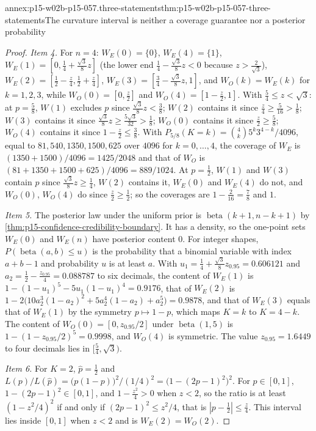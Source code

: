 \begin{annexitem}{annex:p15-w02b-p15-057.three-statements}{thm:p15-w02b-p15-057-three-statements}{The curvature interval is neither a coverage guarantee nor a posterior probability}
\begin{proof}
\emph{Item 4.} For \(n=4\): \(W_E(0)=\{0\}\), \(W_E(4)=\{1\}\),
\(W_E(1)=[0,\frac14+\frac{\sqrt3}8z]\) (the lower end
\(\frac14-\frac{\sqrt3}8z<0\) because \(z>\frac2{\sqrt3}\)),
\(W_E(2)=[\frac12-\frac z4,\frac12+\frac z4]\),
\(W_E(3)=[\frac34-\frac{\sqrt3}8z,1]\), and \(W_O(k)=W_E(k)\) for
\(k=1,2,3\), while \(W_O(0)=[0,\frac z2]\) and \(W_O(4)=[1-\frac z2,1]\).
With \(\frac54\leq z<\sqrt3\): at \(p=\frac58\), \(W(1)\) excludes \(p\)
since \(\frac{\sqrt3}8z<\frac38\); \(W(2)\) contains it since
\(\frac z4\geq\frac5{16}>\frac18\); \(W(3)\) contains it since
\(\frac{\sqrt3}8z\geq\frac{5\sqrt3}{32}>\frac18\); \(W_O(0)\) contains it
since \(\frac z2\geq\frac58\); \(W_O(4)\) contains it since
\(1-\frac z2\leq\frac38\). With
\(P_{5/8}(K=k)=\binom4k5^k3^{4-k}/4096\), equal to \(81,540,1350,1500,625\)
over \(4096\) for \(k=0,\ldots,4\), the coverage of \(W_E\) is
\((1350+1500)/4096=1425/2048\) and that of \(W_O\) is
\((81+1350+1500+625)/4096=889/1024\). At \(p=\frac12\), \(W(1)\) and
\(W(3)\) contain \(p\) since \(\frac{\sqrt3}8z\geq\frac14\), \(W(2)\)
contains it, \(W_E(0)\) and \(W_E(4)\) do not, and \(W_O(0)\), \(W_O(4)\)
do since \(\frac z2\geq\frac12\); so the coverages are \(1-\frac2{16}=\frac78\)
and \(1\).

\emph{Item 5.} The posterior law under the uniform prior is
\(\operatorname{beta}(k+1,n-k+1)\) by
\cref{thm:p15-confidence-credibility-boundary}. It has a density, so the
one-point sets \(W_E(0)\) and \(W_E(n)\) have posterior content \(0\).
For integer shapes, \(P(\operatorname{beta}(a,b)\leq u)\) is the
probability that a binomial variable with index \(a+b-1\) and probability
\(u\) is at least \(a\). With \(u_1=\frac14+\frac{\sqrt3}8z_{0.95}
=0.606121\) and \(a_2=\frac12-\frac{z_{0.95}}4=0.088787\) to six decimals,
the content of \(W_E(1)\) is
\(1-(1-u_1)^5-5u_1(1-u_1)^4=0.9176\), that of \(W_E(2)\) is
\(1-2\bigl(10a_2^3(1-a_2)^2+5a_2^4(1-a_2)+a_2^5\bigr)=0.9878\), and that of
\(W_E(3)\) equals that of \(W_E(1)\) by the symmetry \(p\mapsto1-p\), which
maps \(K=k\) to \(K=4-k\). The content of \(W_O(0)=[0,z_{0.95}/2]\) under
\(\operatorname{beta}(1,5)\) is \(1-(1-z_{0.95}/2)^5=0.9998\), and
\(W_O(4)\) is symmetric. The value \(z_{0.95}=1.6449\) to four decimals
lies in \([\frac54,\sqrt3)\).

\emph{Item 6.} For \(K=2\), \(\hat p=\frac12\) and
\(L(p)/L(\hat p)=\bigl(p(1-p)\bigr)^2/(1/4)^2=\bigl(1-(2p-1)^2\bigr)^2\).
For \(p\in[0,1]\), \(1-(2p-1)^2\in[0,1]\), and \(1-\frac{z^2}4>0\) when
\(z<2\), so the ratio is at least \((1-z^2/4)^2\) if and only if
\((2p-1)^2\leq z^2/4\), that is \(|p-\frac12|\leq\frac z4\). This interval
lies inside \([0,1]\) when \(z<2\) and is \(W_E(2)=W_O(2)\).
\end{proof}
\end{annexitem}

